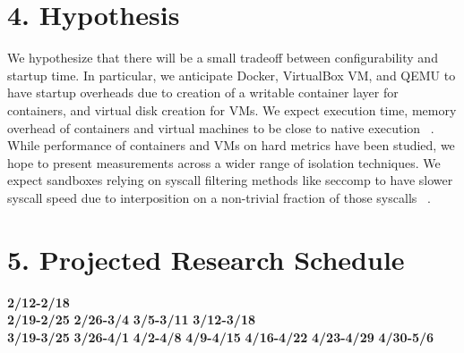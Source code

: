 \documentclass{proc}
\begin{document}
\section*{4. Hypothesis}
We hypothesize that there will be a small tradeoff between configurability and startup time. In particular, we anticipate Docker, VirtualBox VM, and QEMU to have startup overheads due to creation of a writable container layer for containers, and virtual disk creation for VMs. We expect execution time, memory overhead of containers and virtual machines to be close to native execution ~\cite{felter2014docker}. While performance of containers and VMs on hard metrics have been studied, we hope to present measurements across a wider range of isolation techniques. We expect sandboxes relying on syscall filtering methods like seccomp to have slower syscall speed due to interposition on a non-trivial fraction of those syscalls ~\cite{kim2013mbox}.

\section*{5. Projected Research Schedule}
\textbf{2/12-2/18} \\
\textbf{2/19-2/25}
\textbf{2/26-3/4}
\textbf{3/5-3/11}
\textbf{3/12-3/18} \\
\textbf{3/19-3/25}
\textbf{3/26-4/1}
\textbf{4/2-4/8}
\textbf{4/9-4/15}
\textbf{4/16-4/22}
\textbf{4/23-4/29}
\textbf{4/30-5/6}  






\end{document}
